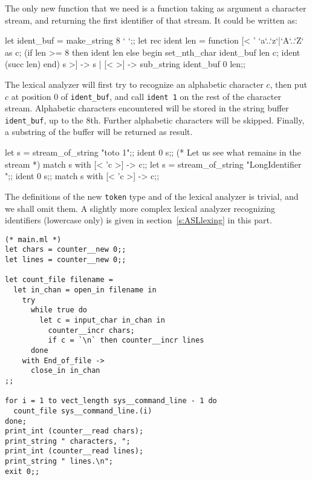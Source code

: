The only new function that we need is a function taking as argument a
character stream, and returning the first identifier of that stream.
It could be written as:
\begin{caml_example}
let ident_buf = make_string 8 ` `;;
let rec ident len = function
  [< ' `a`..`z`|`A`..`Z` as c;
     (if len >= 8 then ident len
      else begin
            set_nth_char ident_buf len c;
            ident (succ len)
           end) s >] -> s
| [< >] -> sub_string ident_buf 0 len;;
\end{caml_example}
The lexical analyzer will first try to recognize an alphabetic
character $c$, then put $c$ at position 0 of \verb|ident_buf|, and
call {\tt ident 1} on the rest of the character stream.  Alphabetic
characters encountered will be stored in the string buffer
\verb|ident_buf|, up to the 8th. Further alphabetic characters will be
skipped. Finally, a substring of the buffer will be returned as
result.
\begin{caml_example}
let s = stream_of_string "toto 1";;
ident 0 s;;
(* Let us see what remains in the stream *)
match s with [< 'c >] -> c;;
let s = stream_of_string "LongIdentifier ";;
ident 0 s;;
match s with [< 'c >] -> c;;
\end{caml_example}

The definitions of the new {\tt token} type and of the lexical analyzer
is trivial, and we shall omit them. A slightly more complex lexical
analyzer recognizing identifiers (lowercase only) is given in
section~\ref{s:ASLlexing} in this part.

\begin{verbatim}
(* main.ml *)
let chars = counter__new 0;;
let lines = counter__new 0;;

let count_file filename =
  let in_chan = open_in filename in
    try
      while true do
        let c = input_char in_chan in
          counter__incr chars;
          if c = `\n` then counter__incr lines
      done
    with End_of_file ->
      close_in in_chan
;;

for i = 1 to vect_length sys__command_line - 1 do
  count_file sys__command_line.(i)
done;
print_int (counter__read chars);
print_string " characters, ";
print_int (counter__read lines);
print_string " lines.\n";
exit 0;;
\end{verbatim}

